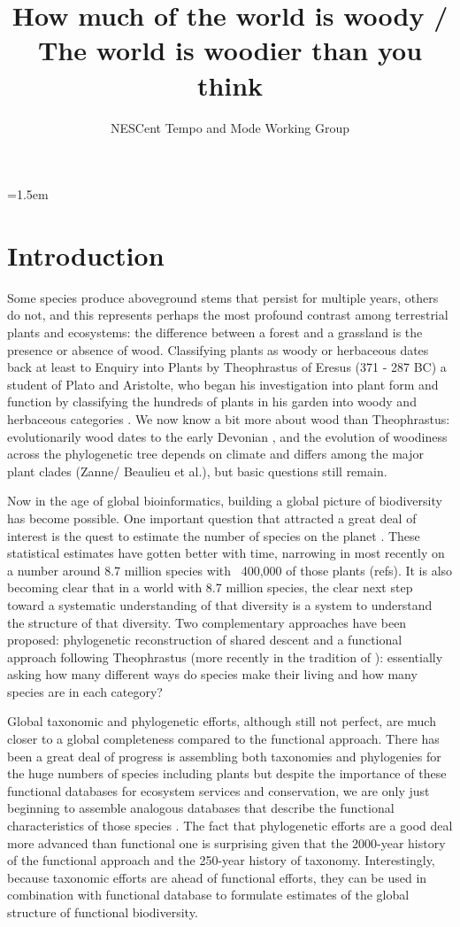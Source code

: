\documentclass[12pt]{article}
\title{How much of the world is woody / The world is woodier than you
  think}
\author{NESCent Tempo and Mode Working Group}
\date{}
\affiliation{\noindent
Fill this in here\ldots}
\begin{document}
\mstitlepage
\parindent=1.5em
\addtolength{\parskip}{.3em}

\section{Introduction}

Some species produce aboveground stems that persist for multiple years, others do not, and this represents perhaps the most profound contrast among terrestrial plants and ecosystems: the difference between a forest and a grassland is the presence or absence of wood. Classifying plants as woody or herbaceous dates back at least to Enquiry into Plants by Theophrastus of Eresus (371 - 287 BC) a student of Plato and Aristolte, who began his investigation into plant form and function by classifying the hundreds of plants in his garden into woody and herbaceous categories \citep{theophrastus1916enquiry}.  We now know a bit more about wood than Theophrastus: evolutionarily wood dates to the early Devonian \citep[~400 mya;][]{gerrienne2011simple}, and the evolution of woodiness across the phylogenetic tree depends on climate and differs among the major plant clades (Zanne/ Beaulieu et al.), but basic questions still remain.

Now in the age of global bioinformatics, building a global picture of biodiversity has become possible.  One important question that attracted a great deal of interest is the quest to estimate the number of species on the planet \citep{erwin1991many, may1988many, stork1993many}.  These statistical estimates have gotten better with time, narrowing in most recently on a number around 8.7 million species with ~400,000 of those plants (refs).  It is also becoming clear that in a world with 8.7 million species, the clear next step toward a systematic understanding of that diversity is a system to understand the structure of that diversity.  Two complementary approaches have been proposed: phylogenetic reconstruction of shared descent \citep{smith2011understanding} and a functional approach following Theophrastus (more recently in the tradition of \citep{grime1979plant, weiher2009challenging, westoby2002plant}): essentially asking how many different ways do species make their living and how many species are in each category?

Global taxonomic and phylogenetic efforts, although still not perfect, are much closer to a global completeness compared to the functional approach.   There has been a great deal of progress is assembling both taxonomies and phylogenies for the huge numbers of species including plants \citep{smith2011understanding} but despite the importance of these functional databases for ecosystem services and conservation, we are only just beginning to assemble analogous databases that describe the functional characteristics of those species \citep{kattge2011try}.   The fact that phylogenetic efforts are a good deal more advanced than functional one is surprising given that the 2000-year history of the functional approach and the 250-year history of taxonomy.  Interestingly, because taxonomic efforts are ahead of functional efforts, they can be used in combination with functional database to formulate estimates of the global structure of functional biodiversity.
\end{document}
